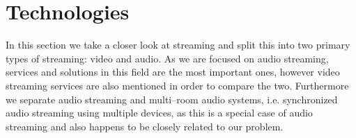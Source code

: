 




\section{Technologies}\label{sec:sota_technologies}
In this section we take a closer look at streaming and split this into two primary types of streaming: video and audio.
As we are focused on audio streaming, services and solutions in this field are the most important ones, however video streaming services are also mentioned in order to compare the two.
Furthermore we separate audio streaming and multi--room audio systems, i.e. synchronized audio streaming using multiple devices, as this is a special case of audio streaming and also happens to be closely related to our problem.

